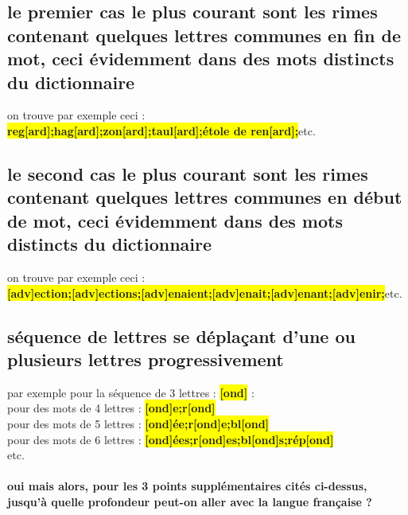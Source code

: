 \documentclass[french]{article}
\begin{document}
\subsection{le premier cas le plus courant sont les rimes contenant quelques lettres communes en fin de mot, ceci évidemment dans des mots distincts du dictionnaire}
on trouve par exemple ceci :\\
\colorbox{yellow}{\textbf{reg[ard];hag[ard];zon[ard];taul[ard];étole de ren[ard];}}etc.
\subsection{le second cas le plus courant sont les rimes contenant quelques lettres communes en début de mot, ceci évidemment dans des mots distincts du dictionnaire}
on trouve par exemple ceci :\\
\colorbox{yellow}{\textbf{[adv]ection;[adv]ections;[adv]enaient;[adv]enait;[adv]enant;[adv]enir;}}etc.
\subsection{séquence de lettres se déplaçant d'une ou plusieurs lettres progressivement}
par exemple pour la séquence de 3 lettres : \colorbox{yellow}{\textbf{[ond]}} :\\
pour des mots de 4 lettres : \colorbox{yellow}{\textbf{[ond]e;r[ond]}}\\
pour des mots de 5 lettres  : \colorbox{yellow}{\textbf{[ond]ée;r[ond]e;bl[ond]}}\\
pour des mots de 6 lettres  : \colorbox{yellow}{\textbf{[ond]ées;r[ond]es;bl[ond]s;rép[ond]}}\\
etc.\\
\paragraph{oui mais alors, pour les 3 points supplémentaires cités ci-dessus, jusqu'à quelle profondeur peut-on aller avec la langue française ?}
\end{document}
